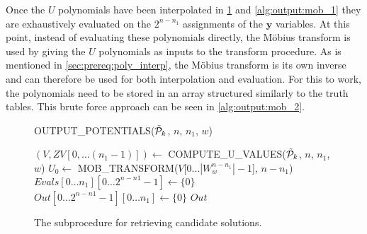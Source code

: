 Once the $U$ polynomials have been interpolated in \cref{alg:output:mob_0} and \cref{alg:output:mob_1} they are exhaustively evaluated on the $2^{n - n_1}$ assignments of the $\mathbf{y}$ variables. At this point, instead of evaluating these polynomials directly, the Möbius transform is used by giving the $U$ polynomials as inputs to the transform procedure. As is mentioned in \cref{sec:prereq:poly_interp}, the Möbius transform is its own inverse and can therefore be used for both interpolation and evaluation. For this to work, the polynomials need to be stored in an array structured similarly to the truth tables. This brute force approach can be seen in \cref{alg:output:mob_2}.

\begin{figure}[ht]
    \centering
    \begin{alg}
        \caption{OUTPUT\_POTENTIALS($\Tilde{\mathcal{P}}_k$, $n$, $n_1$, $w$)}
        \label{alg:output}
        $(V, ZV[0,\dots(n_1 - 1)]) \gets $ COMPUTE\_U\_VALUES($\Tilde{\mathcal{P}}_k$, $n$, $n_1$, $w$)\; \label{alg:output:uvalues}
        $U_0 \gets$ MOB\_TRANSFORM($V$[$0\dots |W^{n - n_1}_{w}| - 1$], $n - n_1$)\; \label{alg:output:mob_0}
        $Evals[0\dots n_1][0\dots 2^{n - n1} - 1] \gets \{0\}$\;
        $Out[0\dots 2^{n - n1} - 1][0\dots n_1] \gets \{0\}$\;
        \Return $Out$\;
    \end{alg}
    \caption{The subprocedure for retrieving candidate solutions.}
\end{figure}

